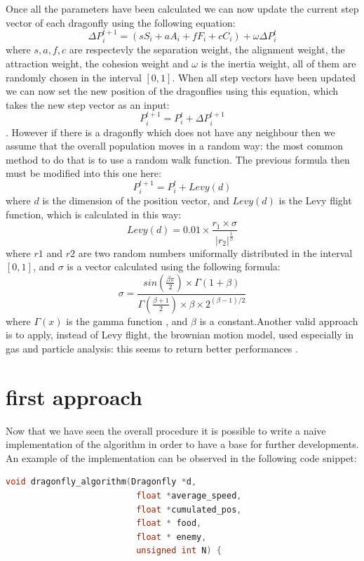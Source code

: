 \documentclass[10pt]{article}
\begin{document}
\begin{multicols}{2}
\noindent Once all the parameters have been calculated we can now update the current step vector of each dragonfly using the following equation: $$\Delta P^{t+1}_{i} = (sS_i + aA_i + fF_i + cC_i) + \omega\Delta P^t_i$$ where $s,a,f,c$ are respectevly the separation weight, the alignment weight, the attraction weight, the cohesion weight and $\omega$ is the inertia weight, all of them are randomly chosen in the interval $[0,1]$. When all step vectors have been updated we can now set the new position of the dragonflies using this equation, which takes the new step vector as an input: $$P^{t+1}_{i} = P_i^t + \Delta P_{i}^{t+1}$$. However if there is a dragonfly which does not have any neighbour then we assume that the overall population moves in a random way: the most common method to do that is to use a random walk function. The previous formula then must be modified into this one here: $$P^{t+1}_i = P_i^t + Levy(d)$$ where $d$ is the dimension of the position vector, and $Levy(d)$ is the Levy flight function, which is calculated in this way: $$Levy(d) = 0.01\times\frac{r_1 \times \sigma}{|r_2|^{\frac{1}{\beta}}}$$ where $r1$ and $r2$ are two random numbers uniformally distributed in the interval $[0,1]$, and $\sigma$ is a vector calculated using the following formula: $$\sigma = \frac{sin(\frac{\beta\pi}{2})\times\Gamma(1+\beta)}{\Gamma(\frac{\beta+1}{2})\times \beta \times 2^{(\beta-1)/2}}$$ where $\Gamma(x)$ is the gamma function \cite{WikiGamma}, and $\beta$ is a constant.Another valid approach is to apply, instead of Levy flight, the brownian motion model, used especially in gas and particle analysis: this seems to return better performances \cite{BDragonfly}. 




\section{first approach}

Now that we have seen the overall procedure it is possible to write a naive implementation of the algorithm in order to 
have a base for further developments. An example of the implementation can be observed in the following code snippet:


\begin{lstlisting}[language=C,caption={first implementation of the dragonfly algorithm}]
  void dragonfly_algorithm(Dragonfly *d,
                          float *average_speed, 
                          float *cumulated_pos, 
                          float * food, 
                          float * enemy, 
                          unsigned int N) {


\end{lstlisting}
\end{multicols}
\end{document}
